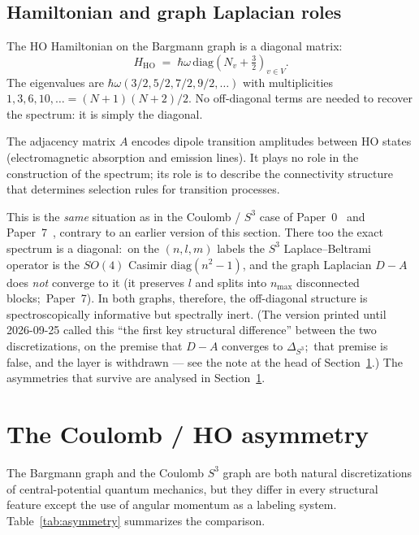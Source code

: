 \documentclass[twocolumn,pra,amsmath,amssymb,superscriptaddress]{revtex4-2}
\begin{document}
\subsection{Hamiltonian and graph Laplacian roles}
\label{sec:roles}

The HO Hamiltonian on the Bargmann graph is a diagonal matrix:
\begin{equation}
  H_{\mathrm{HO}}
  \;=\;
  \hbar\omega \,
  \mathrm{diag}\!\left( N_v + \tfrac{3}{2} \right)_{v \in V}.
  \label{eq:H-graph}
\end{equation}
The eigenvalues are $\hbar\omega(3/2, 5/2, 7/2, 9/2, \ldots)$
with multiplicities $1, 3, 6, 10, \ldots = (N+1)(N+2)/2$.  No
off-diagonal terms are needed to recover the spectrum: it is
simply the diagonal.

The adjacency matrix $A$ encodes dipole transition amplitudes
between HO states (electromagnetic absorption and emission lines).
It plays no role in the construction of the spectrum; its role is
to describe the connectivity structure that determines selection
rules for transition processes.

This is the \emph{same} situation as in the Coulomb / $S^3$ case of
Paper~0~\cite{paper0} and Paper~7~\cite{paper7}, contrary to an earlier
version of this section.  There too the exact spectrum is a diagonal:\
on the $(n, l, m)$ labels the $S^3$ Laplace--Beltrami operator is the
$SO(4)$ Casimir $\mathrm{diag}(n^2 - 1)$, and the graph Laplacian
$D - A$ does \emph{not} converge to it (it preserves $l$ and splits into
$n_{\max}$ disconnected blocks;\ Paper~7).  In both graphs, therefore,
the off-diagonal structure is spectroscopically informative but
spectrally inert.  (The version printed until 2026-09-25 called this
``the first key structural difference'' between the two
discretizations, on the premise that $D - A$ converges to
$\Delta_{S^3}$;\ that premise is false, and the layer is withdrawn ---
see the note at the head of Section~\ref{sec:asymmetry}.)  The
asymmetries that survive are analysed in Section~\ref{sec:asymmetry}.

\section{The Coulomb / HO asymmetry}
\label{sec:asymmetry}

The Bargmann graph and the Coulomb $S^3$ graph are both natural
discretizations of central-potential quantum mechanics, but they
differ in every structural feature except the use of angular
momentum as a labeling system.  Table~\ref{tab:asymmetry}
summarizes the comparison.
\end{document}
